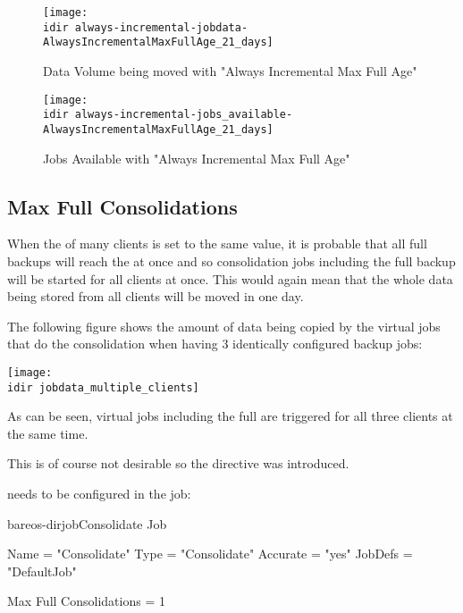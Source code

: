\begin{figure}[htbp]
\centering
\texttt{[image: \\idir always-incremental-jobdata-AlwaysIncrementalMaxFullAge\_21\_days]}
\caption{Data Volume being moved with "Always Incremental Max Full Age"}
\end{figure}%

\begin{figure}[htbp]
\centering
\texttt{[image: \\idir always-incremental-jobs\_available-AlwaysIncrementalMaxFullAge\_21\_days]}
\caption{Jobs Available with "Always Incremental Max Full Age"}
\end{figure}%

\subsection{Max Full Consolidations}
\label{sec:MaxFullConsolidations}

When the  of many clients is set to the same value,
it is probable that all full backups will reach the  at once
and so consolidation jobs including the full backup will be started for all clients at once.
This would again mean that the whole data being stored from all clients will be moved in one day.

The following figure shows the amount of data being copied by the virtual jobs that do the consolidation when having 3 identically configured backup jobs:

\begin{center}
\texttt{[image: \\idir jobdata\_multiple\_clients]}
\end{center}

As can be seen, virtual jobs including the full are triggered for all three clients at the same time.

This is of course not desirable so the directive  was introduced.

 needs to be configured in the  job:

\begin{bareosConfigResource}{bareos-dir}{job}{Consolidate}
Job {
    Name = "Consolidate"
    Type = "Consolidate"
    Accurate = "yes"
    JobDefs = "DefaultJob"

    Max Full Consolidations = 1
}
\end{bareosConfigResource}



